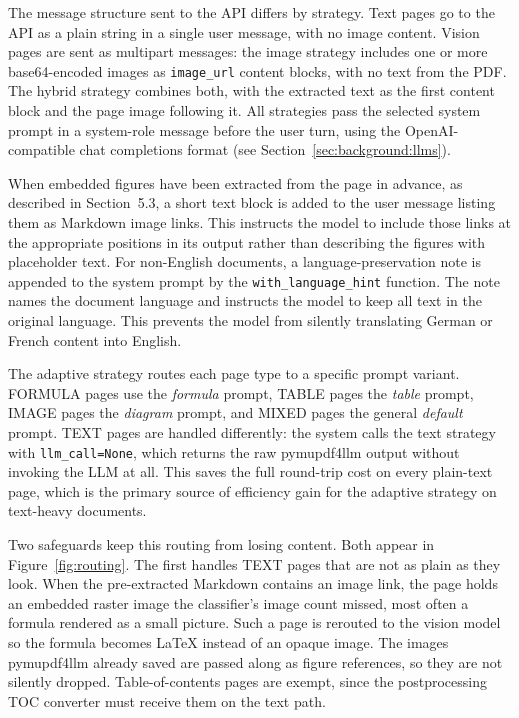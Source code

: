 The message structure sent to the API differs by strategy. Text pages go to the
API as a plain string in a single user message, with no image content. Vision
pages are sent as multipart messages: the image strategy includes one or more
base64-encoded images as \texttt{image\_url} content blocks, with no text from
the PDF. The hybrid strategy combines both, with the extracted text as the first
content block and the page image following it. All strategies pass the selected
system prompt in a system-role message before the user turn, using the
OpenAI-compatible chat completions format (see Section~\ref{sec:background:llms}).

When embedded figures have been extracted from the page in advance, as described in Section~5.3, a short text block is added to the user message listing them as Markdown image links.
This instructs the model to include those links at the appropriate positions in its output rather than describing the figures with placeholder text.
For non-English documents, a language-preservation note is appended to the system prompt by the \texttt{with\_language\_hint} function.
The note names the document language and instructs the model to keep all text in the original language.
This prevents the model from silently translating German or French content into English.

The adaptive strategy routes each page type to a specific prompt variant.
FORMULA pages use the \textit{formula} prompt, TABLE pages the \textit{table} prompt, IMAGE pages the \textit{diagram} prompt, and MIXED pages the general \textit{default} prompt.
TEXT pages are handled differently: the system calls the text strategy with \texttt{llm\_call=None}, which returns the raw pymupdf4llm output without invoking the LLM at all.
This saves the full round-trip cost on every plain-text page, which is the primary source of efficiency gain for the adaptive strategy on text-heavy documents.

Two safeguards keep this routing from losing content. Both appear in Figure~\ref{fig:routing}.
The first handles TEXT pages that are not as plain as they look.
When the pre-extracted Markdown contains an image link, the page holds an embedded raster image the classifier's image count missed, most often a formula rendered as a small picture.
Such a page is rerouted to the vision model so the formula becomes LaTeX instead of an opaque image.
The images pymupdf4llm already saved are passed along as figure references, so they are not silently dropped.
Table-of-contents pages are exempt, since the postprocessing TOC converter must receive them on the text path.


